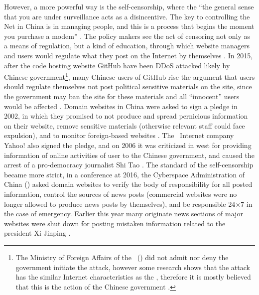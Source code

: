 However, a more powerful way is the self-censorship, where the ``the general sense that you are under surveillance acts as a disincentive. The key to controlling the Net in China is in managing people, and this is a process that begins the moment you purchase a modem'' \citep{barme_great_1997}. The policy makers see the act of censoring not only as a means of regulation, but a kind of education, through which website managers and users would regulate what they post on the Internet by themselves \citep{zhang_behind_2006}. In 2015, after the code hosting website GitHub have been DDoS attacked likely by Chinese government\footnote{The Ministry of Foreign Affairs of the \prc\ (\mfa) did not admit nor deny the government initiate the attack, however some research shows that the attack has the similar Internet characteristics as the \gfw, therefore it is mostly believed that this is the action of the Chinese government \citep{brandom_last_2015,perlroth_chinese_2015}.}, many Chinese users of GitHub rise the argument that users should regulate themselves not post political sensitive materials on the site, since the government may ban the site for these materials and all ``innocent'' users would be affected \citep{__????-16}. Domain websites in China were asked to sign a pledge in 2002, in which they promised to not produce and spread pernicious information on their website, remove sensitive materials (otherwise relevant staff could face expulsion), and to monitor foreign-based websites \citep{the_guardian_chinese_2002}. The \usa\ Internet company Yahoo! also signed the pledge, and on 2006 it was criticized in west for providing information of online activities of user to the Chinese government, and caused the arrest of a pro-democracy journalist Shi Tao \citep{the_associated_press_yahoo_2007}. The standard of the self-censorship became more strict, in a conference at 2016, the Cyberspace Administration of China (\cac) asked domain websites to verify the body of responsibility for all posted information, control the sources of news posts (commercial websites were no longer allowed to produce news posts by themselves), and be responsible 24$\times$7 in the case of emergency. Earlier this year many originate news sections of major websites were shut down for posting mistaken information related to the president Xi Jinping \citep{_8_2016}.


